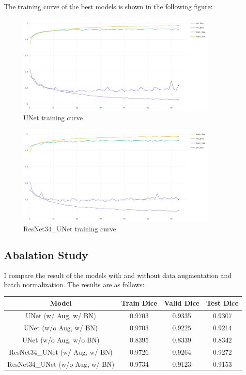 \documentclass{homework}
\begin{document}
The training curve of the best models is shown in the following figure:

\begin{figure}[H]
        \centering
        \includegraphics[width=0.9\textwidth]{unet_train_curve.jpg}
        \caption{UNet training curve}
\end{figure}

\begin{figure}[H]
    \centering
    \includegraphics[width=0.9\textwidth]{resnet34_unet_train_curve.jpg}
    \caption{ResNet34\_UNet training curve}
\end{figure}

\subsection{Abalation Study}
 
I compare the result of the models with and without data augmentation and batch normalization. The results are as follows:

\begin{table}[H]
    \centering
    \begin{tabular}{|c|c|c|c|}
        \hline
        Model & Train Dice & Valid Dice & Test Dice \\
        \hline
        UNet (w/ Aug, w/ BN) & 0.9703 & 0.9335 & 0.9307 \\
        UNet (w/o Aug, w/ BN) & 0.9703 & 0.9225 & 0.9214 \\
        UNet (w/o Aug, w/o BN) & 0.8395 & 0.8339 & 0.8342 \\
        \hline
        ResNet34\_UNet (w/ Aug, w/ BN) & 0.9726 & 0.9264 & 0.9272 \\
        ResNet34\_UNet (w/o Aug, w/ BN) & 0.9734 & 0.9123 & 0.9153 \\
        \hline
    \end{tabular}
\end{table}
\end{document}
